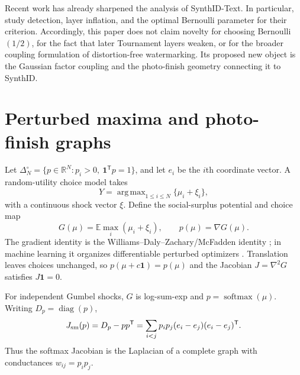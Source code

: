 \documentclass[11pt]{article}
\theoremstyle{definition}
\theoremstyle{remark}
\DeclareMathOperator{\diag}{diag}
\DeclareMathOperator{\softmax}{softmax}
\DeclareMathOperator*{\argmax}{arg\,max}
\newcommand{\R}{\mathbb{R}}
\newcommand{\E}{\mathbb{E}}
\newcommand{\one}{\mathbf{1}}
\newcommand{\Dp}{D_p}
\newcommand{\trans}{\mathsf{T}}
\begin{document}
Recent work has already sharpened the analysis of SynthID-Text. In particular, \citet{omidi2026synthid} study detection, layer inflation, and the optimal Bernoulli parameter for their criterion. Accordingly, this paper does not claim novelty for choosing Bernoulli$(1/2)$, for the fact that later Tournament layers weaken, or for the broader coupling formulation of distortion-free watermarking. Its proposed new object is the Gaussian factor coupling and the photo-finish geometry connecting it to SynthID.

\section{Perturbed maxima and photo-finish graphs}
\label{sec:background}

Let $\Delta_N^\circ=\{p\in\R^N:p_i>0,\ \one^\trans p=1\}$, and let $e_i$ be the $i$th coordinate vector. A random-utility choice model takes
\begin{equation}
Y=\argmax_{1\le i\le N}\{\mu_i+\xi_i\},
\label{eq:random-utility}
\end{equation}
with a continuous shock vector $\xi$. Define the social-surplus potential and choice map
\begin{equation}
G(\mu)=\E\max_i(\mu_i+\xi_i),
\qquad
p(\mu)=\nabla G(\mu).
\label{eq:wdz}
\end{equation}
The gradient identity is the Williams--Daly--Zachary/McFadden identity \citep{mcfadden1981probabilistic}; in machine learning it organizes differentiable perturbed optimizers \citep{berthet2020perturbed}. Translation leaves choices unchanged, so $p(\mu+c\one)=p(\mu)$ and the Jacobian $J=\nabla^2G$ satisfies $J\one=0$.

For independent Gumbel shocks, $G$ is log-sum-exp and $p=\softmax(\mu)$. Writing $\Dp=\diag(p)$,
\begin{equation}
J_{\rm sm}(p)=\Dp-pp^\trans
=\sum_{i<j}p_i p_j(e_i-e_j)(e_i-e_j)^\trans.
\label{eq:softmax-laplacian}
\end{equation}
Thus the softmax Jacobian is the Laplacian of a complete graph with conductances $w_{ij}=p_i p_j$.
\end{document}
